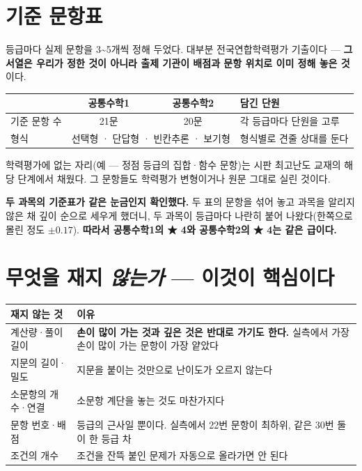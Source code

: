 \documentclass[11pt]{article}
\begin{document}
\section{기준 문항표}

등급마다 실제 문항을 3\textasciitilde5개씩 정해 두었다. 대부분 전국연합학력평가 기출이다 —
\textbf{그 서열은 우리가 정한 것이 아니라 출제 기관이 배점과 문항 위치로 이미 정해 놓은 것}이다.

\begin{center}
\begin{tabular}{@{}lccl@{}}
\toprule
& \textbf{공통수학1} & \textbf{공통수학2} & \textbf{담긴 단원} \\
\midrule
기준 문항 수 & 21문 & 20문 & 각 등급마다 단원을 고루 \\
형식 & \multicolumn{2}{c}{선택형 · 단답형 · 빈칸추론 · 보기형} & 형식별로 견줄 상대를 둔다 \\
\bottomrule
\end{tabular}
\end{center}

\vspace{2mm}
학력평가에 없는 자리(예 — 정점 등급의 집합·함수 문항)는 시판 최고난도 교재의 해당 단계에서 채웠다.
그 문항들도 학력평가 변형이거나 원문 그대로 실린 것이다.

\textbf{두 과목의 기준표가 같은 눈금인지 확인했다.} 두 표의 문항을 섞어 놓고 과목을 알리지 않은 채
깊이 순으로 세우게 했더니, 두 과목이 등급마다 나란히 붙어 나왔다(한쪽으로 몰린 정도 $\pm0.17$).
\textbf{따라서 공통수학1의 ★ 4와 공통수학2의 ★ 4는 같은 급이다.}

\section{무엇을 재지 \emph{않는가} — 이것이 핵심이다}

\begin{center}
\begin{tabular}{@{}p{40mm}p{78mm}@{}}
\toprule
\textbf{재지 않는 것} & \textbf{이유} \\
\midrule
계산량·풀이 길이 & \textbf{손이 많이 가는 것과 깊은 것은 반대로 가기도 한다.}
실측에서 가장 손이 많이 가는 문항이 가장 얕았다 \\
지문의 길이·밀도 & 지문을 붙이는 것만으로 난이도가 오르지 않는다 \\
소문항의 개수·연결 & 소문항 계단을 놓는 것도 마찬가지다 \\
문항 번호·배점 & 등급의 근사일 뿐이다. 실측에서 22번 문항이 최하위, 같은 30번 둘이 한 등급 차 \\
조건의 개수 & 조건을 잔뜩 붙인 문제가 자동으로 올라가면 안 된다 \\
\bottomrule
\end{tabular}
\end{center}
\end{document}
